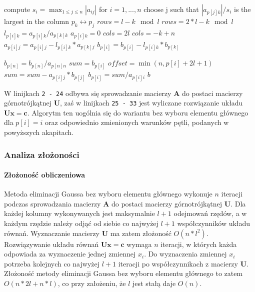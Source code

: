 \documentclass[a4paper]{article}
\begin{document}
\begin{center}
	\begin{algorithmic}[1]
    	\State compute $s_{i} = \max_{1 \leq j \leq n} |a_{i j }|$ for $i = 1, ..., n$
    		\State choose j such that $|a_{p[j] k}| / s_{i}$ is the largest in the column
    		\State $p_{k} \longleftrightarrow p_{j}$
    			\State $rows =  l - k \mod l$
    		\Else
    			\State $rows = 2*l - k \mod l$
    		\EndIf
    			\State $l_{p[i] k} = a_{p[i] k } / a_{p[k] k }$
    			\State $a_{p[i] k} = 0$
    				\State $cols = 2l$
    			\Else
    				\State $cols = -k + n$
    			\EndIf
    				\State $a_{p[i] j} = a_{p[i] j} - l_{p[i] k} * a_{p[k] j}$
    			\EndFor
    			\State $b_{p[i]} = b_{p[i]} - l_{p[i] k} * b_{p[k]}$
    		\EndFor
    	\EndFor
    	
    	\State $b_{p[n]} = b_{p[n]} / a_{p[n] n}$
    		\State $sum = b_{p[i]}$
    		\State $offset = \min(n, p[i] + 2l + 1)$
    			\State $sum = sum - a_{p[i] j } * b_{p[j]}$
    		\EndFor
    		\State $b_{p[i]} = sum / a_{p[i] i}$
    	\EndFor
    	\State \Return $b$
	\EndFunction
	\end{algorithmic}
\end{center}

W linijkach \texttt{2 - 24} odbywa się sprowadzanie macierzy $\mathbf{A}$ do postaci macierzy górnotrójkątnej $\mathbf{U}$, zaś w linijkach \texttt{25 - 33} jest wyliczane rozwiązanie układu $\mathbf{Ux = c}$.
Algorytm ten uogólnia się do wariantu bez wyboru elementu głównego dla $p[i] = i$ oraz odpowiednio zmienionych warunków pętli, podanych w powyższych akapitach.

\subsubsection{Analiza złożoności}
\paragraph{Złożoność obliczeniowa}
Metoda eliminacji Gaussa bez wyboru elementu głównego wykonuje $n$ iteracji podczas sprowadzania macierzy $\mathbf{A}$ do postaci macierzy górnotrójkątnej $\mathbf{U}$. Dla każdej kolumny wykonywanych jest maksymalnie $l + 1$ odejmowań rzędów, a w każdym rzędzie należy odjąć od siebie co najwyżej $l + 1$ współczynników układu równań. Wyznaczanie macierzy $\mathbf{U}$ ma zatem złożoność $O(n * l^2)$. Rozwiązywanie układu równań $\mathbf{Ux = c}$ wymaga $n$ iteracji, w których każda odpowiada za wyznaczenie jednej zmiennej $x_{i}$. Do wyznaczenia zmiennej $x_{i}$ potrzeba kolejnych co najwyżej $l + 1$ iteracji po współczynnikach z macierzy $\mathbf{U}$. Złożoność metody eliminacji Gaussa bez wyboru elementu głównego to zatem $O(n * 2l + n * l)$, co przy założeniu, że $l$ jest stałą daje $O(n)$.
\end{document}
